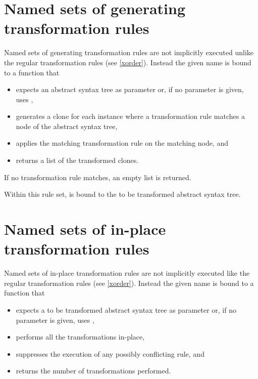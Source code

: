 \section{Named sets of generating transformation rules}\label{named-trrules}

Named sets of generating transformation rules are not implicitly
executed unlike the regular transformation rules (see \ref{xorder}).
Instead the given name is bound to a function that

\begin{itemize}
   \item expects an abstract syntax tree
      as parameter or, if no parameter is given, uses ,
   \item generates a clone for each instance where a
      transformation rule matches a node of the abstract syntax tree,
   \item applies the matching transformation rule on the matching node, and
   \item returns a list of the transformed clones.
\end{itemize}

\noindent
If no transformation rule matches, an empty list is returned.

Within this rule set,  is bound to the
to be transformed abstract syntax tree.

\begin{grammar}
      \produces {} 
	 \lextoken{\{} 
	 \lextoken{\}}
\end{grammar}

\section{Named sets of in-place transformation rules}
\label{named-inplace-trrules}

Named sets of in-place transformation rules are not implicitly executed
like the regular transformation rules (see \ref{xorder}). Instead the
given name is bound to a function that

\begin{itemize}
   \item expects a to be transformed abstract syntax tree
      as parameter or, if no parameter is given, uses ,
   \item performs all the transformations in-place,
   \item suppresses the execution of any possibly conflicting rule, and
   \item returns the number of transformations performed.
\end{itemize}

